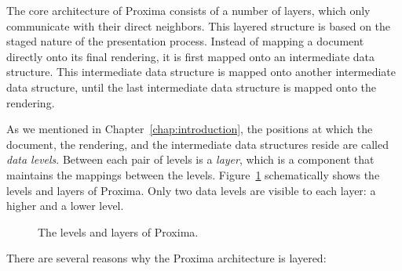 \documentclass{speauth}
\begin{document}
The core architecture of Proxima consists of a number of layers, which only communicate with their direct neighbors. This layered structure is based on the staged nature of the presentation process. Instead of mapping a document directly onto its final rendering, it is first mapped onto an intermediate data structure. This intermediate data structure is mapped onto another intermediate data structure, until the last intermediate data structure is mapped onto the rendering.

As we mentioned in Chapter~\ref{chap:introduction}, the positions at which the document, the rendering, and the intermediate data structures reside are called {\em data levels}. Between each pair of levels is a {\em layer}, which is a component that maintains the mappings between the levels. Figure~\ref{proxlayers} schematically shows the levels and layers of Proxima. Only two data levels are visible to each layer: a higher and a lower level.

\begin{figure}
\begin{center}
\begin{center}
\end{center}
\caption{The levels and layers of Proxima.}\label{proxlayers} 
\end{center}
\end{figure}


There are several reasons why the Proxima architecture is layered: 
\end{document}
